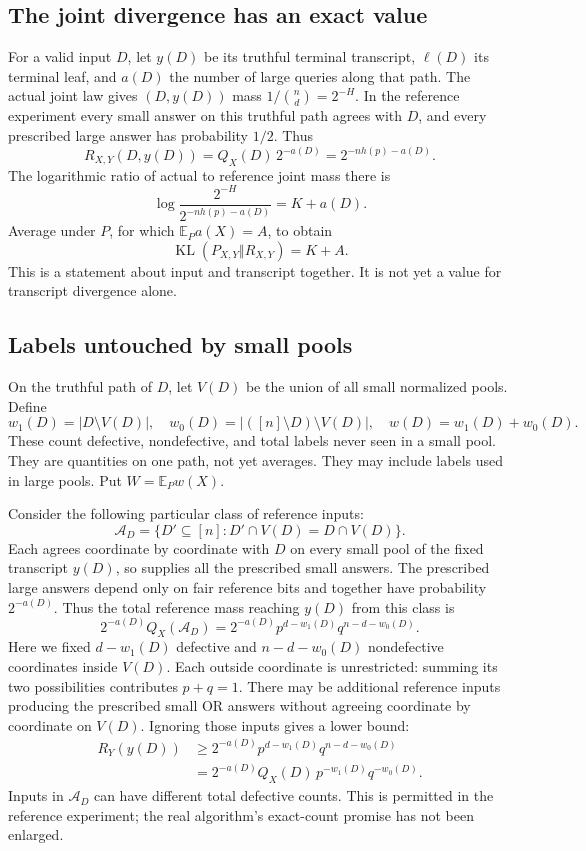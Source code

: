 \documentclass[11pt]{article}
\theoremstyle{definition}
\theoremstyle{remark}
\newcommand{\E}{\mathbb E}
\newcommand{\KL}{\operatorname{KL}}
\numberwithin{equation}{section}
\begin{document}
\subsection{The joint divergence has an exact value}

For a valid input \(D\), let \(y(D)\) be its truthful terminal
transcript, \(\ell(D)\) its terminal leaf, and \(a(D)\) the number
of large queries along that path.
The actual joint law gives \((D,y(D))\) mass \(1/\binom nd=2^{-H}\).
In the reference experiment every small answer on this truthful
path agrees with \(D\), and every prescribed large answer has
probability \(1/2\). Thus
\begin{equation}\label{eq:Rpoint}
 R_{X,Y}(D,y(D))=Q_X(D)\,2^{-a(D)}
 =2^{-nh(p)-a(D)}.
\end{equation}
The logarithmic ratio of actual to reference joint mass there is
\[
 \log\frac{2^{-H}}{2^{-nh(p)-a(D)}}=K+a(D).
\]
Average under \(P\), for which \(\E_P a(X)=A\), to obtain
\begin{equation}\label{eq:jointvalue}
 \boxed{\KL(P_{X,Y}\Vert R_{X,Y})=K+A.}
\end{equation}
This is a statement about input and transcript together. It is not
yet a value for transcript divergence alone.

\subsection{Labels untouched by small pools}

On the truthful path of \(D\), let \(V(D)\) be the union of all
small normalized pools. Define
\[
 w_1(D)=|D\setminus V(D)|,\quad
 w_0(D)=|([n]\setminus D)\setminus V(D)|,\quad
 w(D)=w_1(D)+w_0(D).
\]
These count defective, nondefective, and total labels never seen in
a small pool. They are quantities on one path, not yet averages.
They may include labels used in large pools. Put \(W=\E_P w(X)\).

Consider the following particular class of reference inputs:
\[
 \mathcal A_D=\{D'\subseteq[n]:D'\cap V(D)=D\cap V(D)\}.
\]
Each agrees coordinate by coordinate with \(D\) on every small pool
of the fixed transcript \(y(D)\), so supplies all the prescribed
small answers. The prescribed large answers depend only on fair
reference bits and together have probability \(2^{-a(D)}\).
Thus the total reference mass reaching \(y(D)\) from this class is
\[
 2^{-a(D)}Q_X(\mathcal A_D)
 =2^{-a(D)}p^{d-w_1(D)}q^{n-d-w_0(D)}.
\]
Here we fixed \(d-w_1(D)\) defective and \(n-d-w_0(D)\) nondefective
coordinates inside \(V(D)\). Each outside coordinate is unrestricted:
summing its two possibilities contributes \(p+q=1\). There may be
additional reference inputs producing the prescribed small OR
answers without agreeing coordinate by coordinate on \(V(D)\).
Ignoring those inputs gives a lower bound:
\begin{align}
 R_Y(y(D))
 &\ge2^{-a(D)}p^{d-w_1(D)}q^{n-d-w_0(D)}\nonumber\\
 &=2^{-a(D)}Q_X(D)\,p^{-w_1(D)}q^{-w_0(D)}.
 \label{eq:leafbound}
\end{align}
Inputs in \(\mathcal A_D\) can have different total defective counts.
This is permitted in the reference experiment; the real algorithm's
exact-count promise has not been enlarged.
\end{document}
